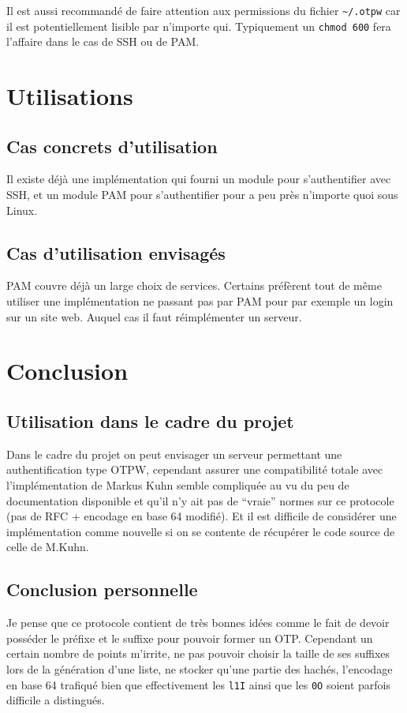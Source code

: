 \documentclass{../res/univ-projet}
\begin{document}
        Il est aussi recommandé de faire attention aux permissions du fichier \verb?~/.otpw? car
    il est potentiellement lisible par n'importe qui. Typiquement un \verb?chmod 600? fera l'affaire
    dans le cas de SSH ou de PAM.

\section{Utilisations}
\subsection{Cas concrets d'utilisation}
        Il existe déjà une implémentation qui fourni un module pour s'authentifier avec SSH, et un module
    PAM pour s'authentifier pour a peu près n'importe quoi sous Linux.

\subsection{Cas d'utilisation envisagés}
        PAM couvre déjà un large choix de services. Certains préfèrent tout de même utiliser une implémentation
    ne passant pas par PAM pour par exemple un login sur un site web. Auquel cas il faut réimplémenter un serveur.

\section{Conclusion}
\subsection{Utilisation dans le cadre du projet}
        Dans le cadre du projet on peut envisager un serveur permettant une authentification type OTPW, cependant
    assurer une compatibilité totale avec l'implémentation de Markus Kuhn semble compliquée au vu du peu de documentation
    disponible et qu'il n'y ait pas de ``vraie'' normes sur ce protocole (pas de RFC + encodage en base 64 modifié).
    Et il est difficile de considérer une implémentation comme nouvelle si on se contente de récupérer le code source
    de celle de M.Kuhn.

\subsection{Conclusion personnelle}
        Je pense que ce protocole contient de très bonnes idées comme le fait de devoir posséder le préfixe et
    le suffixe pour pouvoir former un OTP. Cependant un certain nombre de points m'irrite, ne pas pouvoir choisir la
    taille de ses suffixes lors de la génération d'une liste, ne stocker qu'une partie des hachés, l'encodage en base 64 
    trafiqué bien que effectivement les \verb?l1I? ainsi que les \verb?0O? soient parfois difficile a distingués. 
\end{document}
